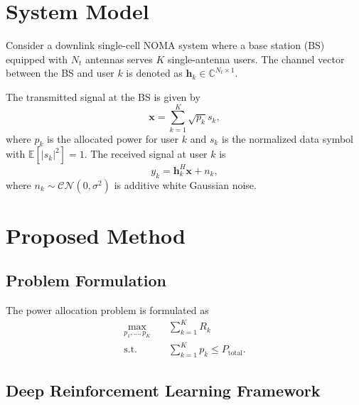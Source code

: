 \documentclass[journal]{IEEEtran}
\begin{document}

\section{System Model}
\label{sec:system_model}

Consider a downlink single-cell NOMA system where a base station (BS) equipped
with $N_t$ antennas serves $K$ single-antenna users. The channel vector between
the BS and user $k$ is denoted as $\mathbf{h}_k \in \mathbb{C}^{N_t \times 1}$.

The transmitted signal at the BS is given by
\begin{equation}
\label{eq:transmitted_signal}
\mathbf{x} = \sum_{k=1}^K \sqrt{p_k}s_k,
\end{equation}
where $p_k$ is the allocated power for user $k$ and $s_k$ is the normalized data
symbol with $\mathbb{E}[|s_k|^2] = 1$. The received signal at user $k$ is
\begin{equation}
\label{eq:received_signal}
y_k = \mathbf{h}_k^H\mathbf{x} + n_k,
\end{equation}
where $n_k \sim \mathcal{CN}(0, \sigma^2)$ is additive white Gaussian noise.


\section{Proposed Method}
\label{sec:proposed_method}

\subsection{Problem Formulation}

The power allocation problem is formulated as
\begin{align}
\label{eq:optimization}
\max_{p_1,\ldots,p_K} \quad & \sum_{k=1}^K R_k \\
\text{s.t.} \quad & \sum_{k=1}^K p_k \leq P_{\mathrm{total}}.
\end{align}

\subsection{Deep Reinforcement Learning Framework}
\end{document}
